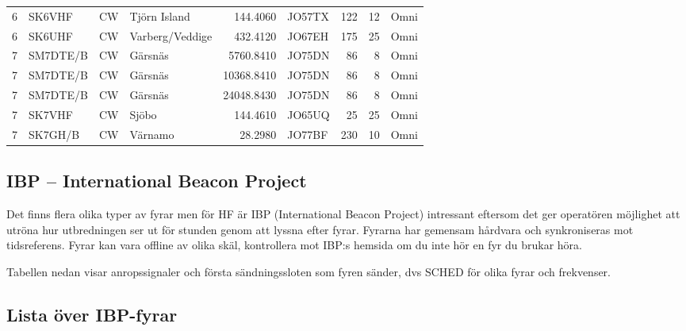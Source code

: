 {\begin{landscape}
\begin{longtable}{rlllrlrrl}
	                 6 & SK6VHF     & CW      & Tjörn Island           &     144.4060 & JO57TX      &      122 &       12 & Omni         \\
	                 6 & SK6UHF     & CW      & Varberg/Veddige        &     432.4120 & JO67EH      &      175 &       25 & Omni         \\
	                 7 & SM7DTE/B   & CW      & Gärsnäs                &    5760.8410 & JO75DN      &       86 &        8 & Omni         \\
	                 7 & SM7DTE/B   & CW      & Gärsnäs                &   10368.8410 & JO75DN      &       86 &        8 & Omni         \\
	                 7 & SM7DTE/B   & CW      & Gärsnäs                &   24048.8430 & JO75DN      &       86 &        8 & Omni         \\
	                 7 & SK7VHF     & CW      & Sjöbo                  &     144.4610 & JO65UQ      &       25 &       25 & Omni         \\
	                 7 & SK7GH/B    & CW      & Värnamo                &      28.2980 & JO77BF      &      230 &       10 & Omni
\end{longtable}
\end{landscape}

\clearpage

\subsection{IBP -- International Beacon Project}

Det finns flera olika typer av fyrar men för HF är IBP (International Beacon
Project) intressant eftersom det ger operatören möjlighet att utröna hur
utbredningen ser ut för stunden genom att lyssna efter fyrar. Fyrarna har
gemensam hårdvara och synkroniseras mot tidsreferens. Fyrar kan vara offline
av olika skäl, kontrollera mot IBP:s hemsida om du inte hör en fyr du brukar
höra.

Tabellen nedan visar anropssignaler och första sändningssloten som fyren
sänder, dvs SCHED för olika fyrar och frekvenser.

\subsection{Lista över IBP-fyrar}

}
